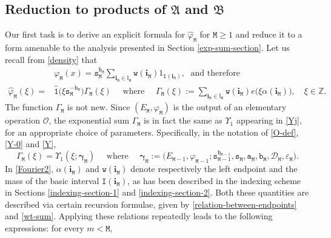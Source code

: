 \documentclass[12pt, twoside]{article}
\theoremstyle{definition}
\numberwithin{equation}{section}
\begin{document}
\subsection{Reduction to products of $\mathfrak A$ and $\mathfrak B$}  
Our first task is to derive an explicit formula for $\widehat{\varphi}_{\mathtt M}$ for $\mathtt M \geq 1$ and reduce it to a form amenable to the analysis presented in Section \ref{exp-sum-section}. Let us recall from \eqref{density} that 
\begin{align}  
&\varphi_{\mathtt M}(x) = \mathtt s_{\mathtt M}^{\mathtt b_{\mathtt M}} \sum_{\mathbf i_{\mathtt M}\in \mathbb I_{\mathtt M}}  \mathtt w(\mathbf i_{\mathtt M}) 1_{\mathtt I(\mathbf i_{\mathtt M})}, \; \text{ and therefore } \nonumber \\ \widehat{\varphi}_{\mathtt M}(\xi) =  &\widehat{\mathtt 1} \bigl(\xi \mathtt s_{\mathtt M}^{-\mathtt b_{\mathtt M}} \bigr) \Gamma_{\mathtt M}(\xi) \quad \text{ where } \quad
\Gamma_{\mathtt M}(\xi) := \sum_{\mathbf i_{\mathtt M} \in \mathbb I_{\mathtt M}} \mathtt w(\mathbf i_{\mathtt M})  e \bigl(\xi \alpha(\mathbf i_{\mathtt M})\bigr), \quad \xi \in \mathbb Z. \label{Fourier2} 
\end{align}  
The function $\Gamma_{\mathtt M}$ is not new. Since $(E_{\mathtt M}, \varphi_{\mathtt M})$ is the output of an elementary operation $\mathscr{O}$, the exponential sum $\Gamma_{\mathtt M}$ is in fact the same as $\Upsilon_1$ appearing in \eqref{Yj}, for an appropriate choice of parameters. Specifically, in the notation of \eqref{O-def}, \eqref{Y-0} and \eqref{Y}, 
\begin{equation} \label{big-and-little-gamma}
\Gamma_{\mathtt M}(\xi) = \Upsilon_1(\xi; \pmb{\gamma}_{\mathtt M}) \quad \text{ where } \quad \pmb{\gamma}_{\mathtt M} := \bigl(E_{\mathtt M-1}, \varphi_{\mathtt M-1}; \mathtt s_{\mathtt M-1}^{\mathtt b_{\mathtt M-1}}, \mathtt s_{\mathtt M}, \mathtt a_{\mathtt M}, \mathtt b_{\mathtt M}, \mathscr{D}_{\mathtt M}, \varepsilon_{\mathtt M}\bigr).
\end{equation}  
In \eqref{Fourier2}, $\alpha(\mathbf i_{\mathtt M})$ and $\mathtt w(\mathbf i_{\mathtt M})$ denote respectively the left endpoint and the mass of the basic interval $\mathtt I(\mathbf i_{\mathtt M})$, as has been described in the indexing scheme in Sections \ref{indexing-section-1} and \ref{indexing-section-2}. Both these quantities are described via certain recursion formulae, given by \eqref{relation-between-endpoints} and \eqref{wt-sum}. Applying these relations repeatedly leads to the following expressions: for every $m < \mathtt M$, 
\end{document}
